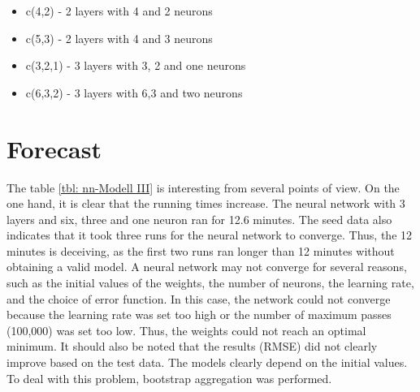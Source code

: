 \begin{itemize}
	\item c(4,2) - 2 layers with 4 and 2 neurons 
	\item c(5,3) - 2 layers with  4 and 3 neurons
	\item c(3,2,1) - 3 layers with  3, 2 and one neurons
	\item c(6,3,2) - 3 layers with  6,3 and two neurons
\end{itemize}

\section{Forecast} \label{sec: prediction}

	The table \ref{tbl: nn-Modell III} is interesting from several points of view. On the one hand, it is clear that the running times increase. The neural network with 3 layers and six, three and one neuron ran for 12.6 minutes. The seed data also indicates that it took three runs for the neural network to converge. Thus, the 12 minutes is deceiving, as the first two runs ran longer than 12 minutes without obtaining a valid model. A neural network may not converge for several reasons, such as the initial values of the weights, the number of neurons, the learning rate, and the choice of error function. In this case, the network could not converge because the learning rate was set too high or the number of maximum passes (100,000) was set too low. Thus, the weights could not reach an optimal minimum. It should also be noted that the results (RMSE) did not clearly improve based on the test data. The models clearly depend on the initial values. To deal with this problem, bootstrap aggregation was performed.


